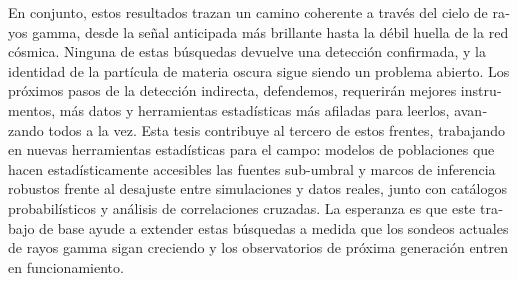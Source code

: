 \begin{otherlanguage}{spanish}
En conjunto, estos resultados trazan un camino coherente a través del cielo de rayos gamma, desde la señal anticipada más brillante hasta la débil huella de la red cósmica. Ninguna de estas búsquedas devuelve una detección confirmada, y la identidad de la partícula de materia oscura sigue siendo un problema abierto. Los próximos pasos de la detección indirecta, defendemos, requerirán mejores instrumentos, más datos y herramientas estadísticas más afiladas para leerlos, avanzando todos a la vez. Esta tesis contribuye al tercero de estos frentes, trabajando en nuevas herramientas estadísticas para el campo: modelos de poblaciones que hacen estadísticamente accesibles las fuentes sub-umbral y marcos de inferencia robustos frente al desajuste entre simulaciones y datos reales, junto con catálogos probabilísticos y análisis de correlaciones cruzadas. La esperanza es que este trabajo de base ayude a extender estas búsquedas a medida que los sondeos actuales de rayos gamma sigan creciendo y los observatorios de próxima generación entren en funcionamiento.
\end{otherlanguage}
